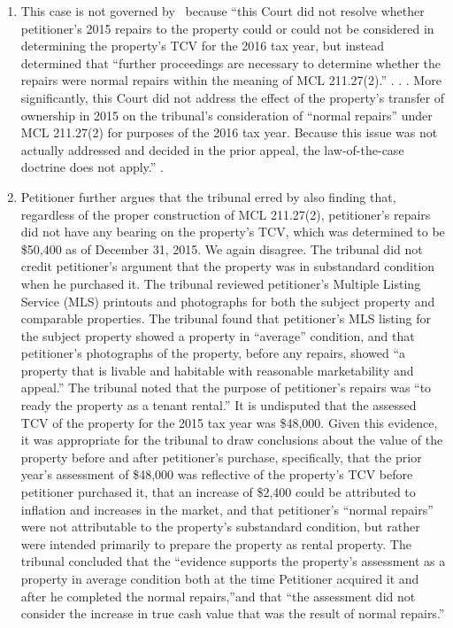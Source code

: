 \documentclass[12pt,\documentclassflag]{michiganCourtOfAppealsBrief}
\begin{document}
\begin{enumerate}
\item This case is not governed by \cite{Patru 1}\ because ``this Court did not resolve whether petitioner's 2015 repairs to the property could or could not be considered in determining the property's TCV for the 2016 tax year, but instead
determined that ``further proceedings are necessary to determine whether the repairs were normal
repairs within the meaning of MCL 211.27(2).'' . . . More significantly, this Court
did not address the effect of the property's transfer of ownership in 2015 on the tribunal's
consideration of ``normal repairs'' under MCL 211.27(2) for purposes of the 2016 tax year.
Because this issue was not actually addressed and decided in the prior appeal, the law-of-the-case
doctrine does not apply.'' .

\item Petitioner further argues that the tribunal erred by also finding that, regardless of the proper
construction of MCL 211.27(2), petitioner's repairs did not have any bearing on the property's
TCV, which was determined to be \$50,400 as of December 31, 2015. We again disagree. The
tribunal did not credit petitioner's argument that the property was in substandard condition when
he purchased it. The tribunal reviewed petitioner's Multiple Listing Service (MLS) printouts and
photographs for both the subject property and comparable properties. The tribunal found that
petitioner's MLS listing for the subject property showed a property in ``average'' condition, and
that petitioner's photographs of the property, before any repairs, showed ``a property that is livable
and habitable with reasonable marketability and appeal.'' The tribunal noted that the purpose of
petitioner's repairs was ``to ready the property as a tenant rental.'' It is undisputed that the assessed
TCV of the property for the 2015 tax year was \$48,000. Given this evidence, it was appropriate
for the tribunal to draw conclusions about the value of the property before and after petitioner's
purchase, specifically, that the prior year's assessment of \$48,000 was reflective of the property's
TCV before petitioner purchased it, that an increase of \$2,400 could be attributed to inflation and 
increases in the market, and that petitioner's ``normal repairs'' were not attributable to the
property's substandard condition, but rather were intended primarily to prepare the property as
rental property. The tribunal concluded that the ``evidence supports the property's assessment as
a property in average condition both at the time Petitioner acquired it and after he completed the
normal repairs,''and that ``the assessment did not consider the increase in true cash value that was
the result of normal repairs.''


\end{enumerate}
\end{document}
